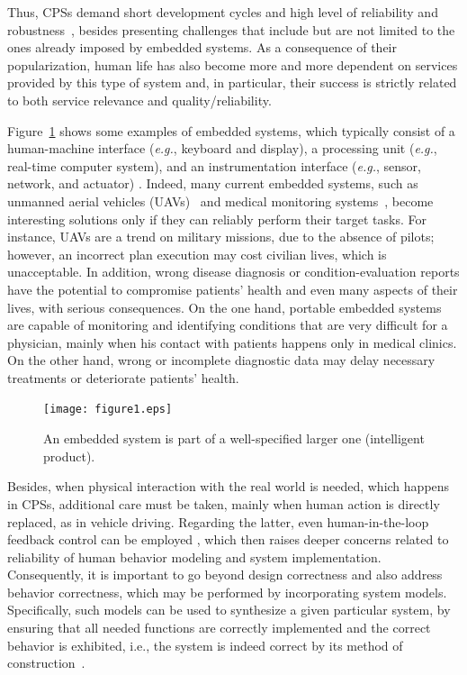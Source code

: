 \documentclass[format=acmsmall, review=false, screen=true]{acmart}
\begin{document}
Thus, CPSs demand short development cycles and high level of reliability and robustness~\cite{leeCPS,leeCPS2}, besides presenting challenges that include but are not limited to the ones already imposed by embedded systems. As a consequence of their popularization, human life has also become more and more dependent on services provided by this type of system and, in particular, their success is strictly related to both service relevance and quality/reliability. 

Figure~\ref{intelligent-product} shows some examples of embedded systems, which typically consist of a human-machine interface ({\it e.g.}, keyboard and display), a processing unit ({\it e.g.}, real-time computer system), and an instrumentation interface ({\it e.g.}, sensor, network, and actuator) \cite{Kopetz11}. Indeed, many current embedded systems, such as unmanned aerial vehicles (UAVs)~\cite{groza2015formal} and medical monitoring systems~\cite{Cordeiro09}, become interesting solutions only if they can reliably perform their target tasks. For instance, UAVs are a trend on military missions, due to the absence of pilots; however, an incorrect plan execution may cost civilian lives, which is unacceptable. In addition, wrong disease diagnosis or condition-evaluation reports have the potential to compromise patients' health and even many aspects of their lives, with serious consequences. On the one hand, portable embedded systems are capable of monitoring and identifying conditions that are very difficult for a physician, mainly when his contact with patients happens only in medical clinics. On the other hand, wrong or incomplete diagnostic data may delay necessary treatments or deteriorate patients' health. 
%
\begin{figure}[!t]
	\centering
	\texttt{[image: figure1.eps]}
	\caption{An embedded system is part of a well-specified larger one (intelligent product).}
	\label{intelligent-product}
\end{figure}

Besides, when physical interaction with the real world is needed, which happens in CPSs, additional care must be taken, mainly when human action is directly replaced, as in vehicle driving. Regarding the latter, even human-in-the-loop feedback control can be employed \cite{munir}, which then raises deeper concerns related to reliability of human behavior modeling and system implementation. Consequently, it is important to go beyond design correctness and also address behavior correctness, which may be performed by incorporating system models. Specifically, such models can be used to synthesize a given particular system, by ensuring that all needed functions are correctly implemented and the correct behavior is exhibited, {i.e.}, the system is indeed correct by its method of construction~\cite{Abate17}.
\end{document}
